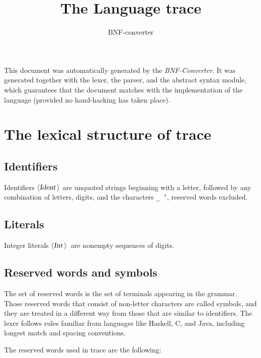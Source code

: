 \documentclass[a4paper,11pt]{article}
\author{BNF-converter}
\title{The Language trace}
\begin{document}
\maketitle

\newcommand{\emptyP}{\mbox{$\epsilon$}}
\newcommand{\terminal}[1]{\mbox{{\texttt {#1}}}}
\newcommand{\nonterminal}[1]{\mbox{$\langle \mbox{{\sl #1 }} \! \rangle$}}
\newcommand{\arrow}{\mbox{::=}}
\newcommand{\delimit}{\mbox{$|$}}
\newcommand{\reserved}[1]{\mbox{{\texttt {#1}}}}
\newcommand{\literal}[1]{\mbox{{\texttt {#1}}}}
\newcommand{\symb}[1]{\mbox{{\texttt {#1}}}}

This document was automatically generated by the {\em BNF-Converter}. It was generated together with the lexer, the parser, and the abstract syntax module, which guarantees that the document matches with the implementation of the language (provided no hand-hacking has taken place).

\section*{The lexical structure of trace}
\subsection*{Identifiers}
Identifiers \nonterminal{Ident} are unquoted strings beginning with a letter,
followed by any combination of letters, digits, and the characters {\tt \_ '},
reserved words excluded.


\subsection*{Literals}
Integer literals \nonterminal{Int}\ are nonempty sequences of digits.




\subsection*{Reserved words and symbols}
The set of reserved words is the set of terminals appearing in the grammar. Those reserved words that consist of non-letter characters are called symbols, and they are treated in a different way from those that are similar to identifiers. The lexer follows rules familiar from languages like Haskell, C, and Java, including longest match and spacing conventions.

The reserved words used in trace are the following: \\
\end{document}
